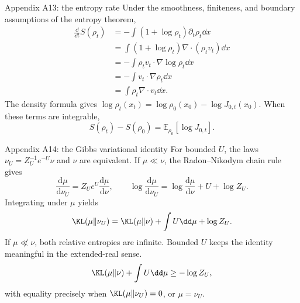 \begin{frame}[t]{Appendix A13: the entropy rate}
\hypertarget{app:entropy}{}
Under the smoothness, finiteness, and boundary assumptions of the entropy theorem,
\begin{equation*}
  \begin{aligned}
    \frac{\dd}{\dd t}S(\rho_t)
    &=-\int(1+\log\rho_t)\partial_t\rho_t\dd x\\
    &=\int(1+\log\rho_t)\nabla\cdot(\rho_tv_t)\dd x\\
    &=-\int\rho_tv_t\cdot\nabla\log\rho_t\dd x\\
    &=-\int v_t\cdot\nabla\rho_t\dd x\\
    &=\int\rho_t\nabla\cdot v_t\dd x.
  \end{aligned}
\end{equation*}
The density formula gives $\log\rho_t(x_t)=\log\rho_0(x_0)-\log J_{0,t}(x_0)$.
When these terms are integrable,
\begin{equation*}
  S(\rho_t)-S(\rho_0)=\mathbb E_{\rho_0}[\log J_{0,t}].
\end{equation*}
\end{frame}

\begin{frame}[t]{Appendix A14: the Gibbs variational identity}
\hypertarget{app:gibbs}{}
For bounded $U$, the laws $\nu_U=Z_U^{-1}e^{-U}\nu$ and $\nu$ are equivalent.
If $\mu\ll\nu$, the Radon--Nikodym chain rule gives
\begin{equation*}
  \frac{\mathrm d\mu}{\mathrm d\nu_U}
  =Z_Ue^U\frac{\mathrm d\mu}{\mathrm d\nu},\qquad
  \log\frac{\mathrm d\mu}{\mathrm d\nu_U}
  =\log\frac{\mathrm d\mu}{\mathrm d\nu}+U+\log Z_U.
\end{equation*}
Integrating under $\mu$ yields
\begin{equation*}
  \KL(\mu\Vert\nu_U)=\KL(\mu\Vert\nu)+\int U\dd\mu+\log Z_U.
\end{equation*}
If $\mu\not\ll\nu$, both relative entropies are infinite. Bounded $U$ keeps the
identity meaningful in the extended-real sense.
\begin{equation*}
  \KL(\mu\Vert\nu)+\int U\dd\mu\geq-\log Z_U,
\end{equation*}
with equality precisely when $\KL(\mu\Vert\nu_U)=0$, or $\mu=\nu_U$.
\end{frame}
